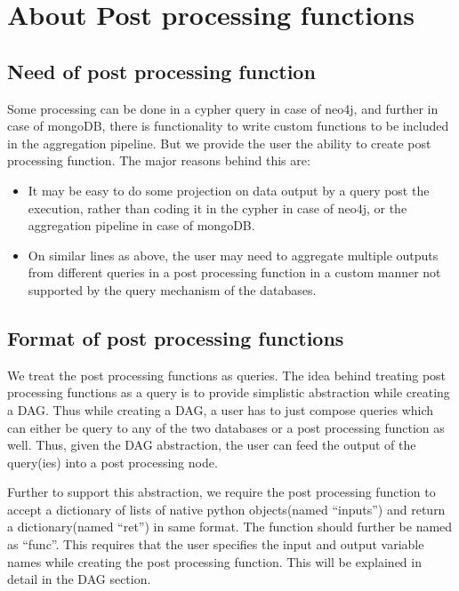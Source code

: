 \documentclass[letterpaper,10pt,english]{sphinxmanual}
\begin{document}
\chapter{About Post processing functions}
\label{\detokenize{postprocessing:about-post-processing-functions}}\label{\detokenize{postprocessing::doc}}

\section{Need of post processing function}
\label{\detokenize{postprocessing:need-of-post-processing-function}}
Some processing can be done in a cypher query in case of neo4j, and further in case of mongoDB, there is functionality to write custom functions to be included in the aggregation pipeline. But we provide the user the ability to create post processing function. The major reasons behind this are:
\begin{itemize}
\item {} 
It may be easy to do some projection on data output by a query post the execution, rather than coding it in the cypher in case of neo4j, or the aggregation pipeline in case of mongoDB.

\item {} 
On similar lines as above, the user may need to aggregate multiple outputs from different queries in a post processing function in a custom manner not supported by the query mechanism of the databases.

\end{itemize}


\section{Format of post processing functions}
\label{\detokenize{postprocessing:format-of-post-processing-functions}}
We treat the post processing functions as queries. The idea behind treating post processing functions as a query is to provide simplistic abstraction while creating a DAG. Thus while creating a DAG, a user has to just compose queries which can either be query to any of the two databases or a post processing function as well. Thus, given the DAG abstraction, the user can feed the output of the query(ies) into a post processing node.

Further to support this abstraction, we require the post processing function to accept a dictionary of lists of native python objects(named “inputs”) and return a dictionary(named “ret”) in same format. The function should further be named as “func”. This requires that the user specifies the input and output variable names while creating the post processing function. This will be explained in detail in the DAG section.
\end{document}
